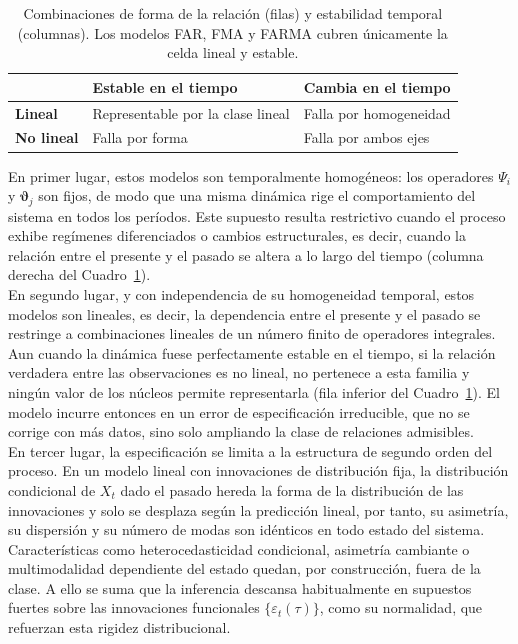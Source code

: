 \begin{table}[ht]
\centering
\begin{tabular}{lll}
\hline
 & \textbf{Estable en el tiempo} & \textbf{Cambia en el tiempo} \\
\hline
\textbf{Lineal} & Representable por la clase lineal & Falla por homogeneidad \\
\textbf{No lineal} & Falla por forma & Falla por ambos ejes \\
\hline
\end{tabular}
\caption{Combinaciones de forma de la relación (filas) y estabilidad
temporal (columnas). Los modelos FAR, FMA y FARMA cubren únicamente la
celda lineal y estable.}
\label{tab:limitaciones}
\end{table}

En primer lugar, estos modelos son temporalmente homogéneos: los operadores $\Psi_i$ y $\boldsymbol{\vartheta}_j$ son fijos, de modo que una misma dinámica rige el comportamiento del sistema en todos los períodos. Este supuesto resulta restrictivo cuando el proceso exhibe regímenes diferenciados o cambios estructurales, es decir, cuando la relación entre el presente y el pasado se altera a lo largo del tiempo (columna derecha del Cuadro~\ref{tab:limitaciones}).\\

En segundo lugar, y con independencia de su homogeneidad temporal, estos modelos son lineales, es decir, la dependencia entre el presente y el pasado se restringe a combinaciones lineales de un número finito de operadores integrales. Aun cuando la dinámica fuese perfectamente estable en el tiempo, si la relación verdadera entre las observaciones es no lineal, no pertenece a esta familia y ningún valor de los núcleos permite representarla (fila inferior del Cuadro~\ref{tab:limitaciones}). El modelo incurre entonces en un error de especificación irreducible, que no se corrige con más datos, sino solo ampliando la clase de relaciones admisibles.\\

En tercer lugar, la especificación se limita a la estructura de segundo orden del proceso. En un modelo lineal con innovaciones de distribución fija, la distribución condicional de $X_t$ dado el pasado hereda la forma de la distribución de las innovaciones y solo se desplaza según la predicción lineal, por tanto, su asimetría, su dispersión y su número de modas son idénticos en todo estado del sistema. Características como heterocedasticidad condicional, asimetría cambiante o multimodalidad dependiente del estado quedan, por construcción, fuera de la clase. A ello se suma que la inferencia descansa habitualmente en supuestos fuertes sobre las innovaciones funcionales $\{\varepsilon_t(\tau)\}$, como su normalidad, que refuerzan esta rigidez distribucional.\\

